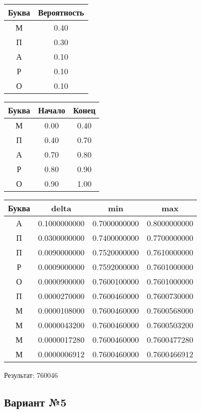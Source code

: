 \documentclass[a4paper, 12pt]{article}
\begin{document}
\begin{center}
 \begin{tabular}{ |c|c| } 
  \hline
     Буква & Вероятность \\ \hline
М & 0.40\\\hline
П & 0.30\\\hline
А & 0.10\\\hline
Р & 0.10\\\hline
О & 0.10
\\ \hline \end{tabular}
\end{center}
\begin{center}
 \begin{tabular}{ |c|c|c| } 
  \hline
     Буква & Начало & Конец \\ \hline
М & 0.00 & 0.40\\\hline
П & 0.40 & 0.70\\\hline
А & 0.70 & 0.80\\\hline
Р & 0.80 & 0.90\\\hline
О & 0.90 & 1.00
\\ \hline \end{tabular}
\end{center}
\begin{center}
 \begin{tabular}{ |c|c|c|c| } 
  \hline
     Буква & delta & min & max \\ \hline
А & 0.1000000000 & 0.7000000000 & 0.8000000000\\\hline
П & 0.0300000000 & 0.7400000000 & 0.7700000000\\\hline
П & 0.0090000000 & 0.7520000000 & 0.7610000000\\\hline
Р & 0.0009000000 & 0.7592000000 & 0.7601000000\\\hline
О & 0.0000900000 & 0.7600100000 & 0.7601000000\\\hline
П & 0.0000270000 & 0.7600460000 & 0.7600730000\\\hline
М & 0.0000108000 & 0.7600460000 & 0.7600568000\\\hline
М & 0.0000043200 & 0.7600460000 & 0.7600503200\\\hline
М & 0.0000017280 & 0.7600460000 & 0.7600477280\\\hline
М & 0.0000006912 & 0.7600460000 & 0.7600466912
\\ \hline \end{tabular}
\end{center}
Результат: 760046
\pagebreak
\subsection{Вариант №5}
\end{document}
